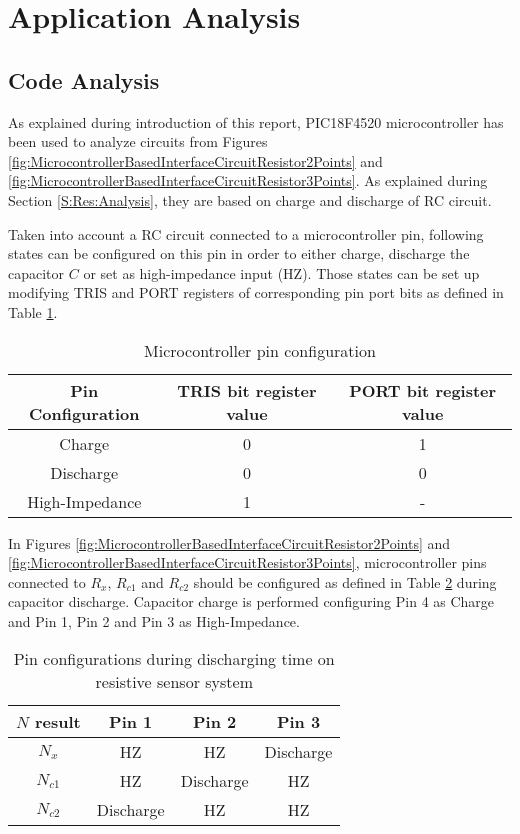 \section{Application Analysis}\label{S:Res:Code}


\subsection{Code Analysis}\label{SS:Res:Code:Analysis}
As explained during introduction of this report, PIC18F4520 microcontroller has been used to analyze circuits from Figures \ref{fig:MicrocontrollerBasedInterfaceCircuitResistor2Points} and \ref{fig:MicrocontrollerBasedInterfaceCircuitResistor3Points}. As explained during Section \ref{S:Res:Analysis}, they are based on charge and discharge of RC circuit.
\medskip

Taken into account a RC circuit connected to a microcontroller pin, following states can be configured on this pin in order to either charge, discharge the capacitor $C$ or set as high-impedance input (HZ). Those states can be set up modifying TRIS and PORT registers of corresponding pin port bits as defined in Table \ref{tab:PinConfigurations}.
\medskip

\begin{table}[h]
\centering
\begin{tabular}{|c|c|c|}
\hline
Pin Configuration & TRIS bit register value & PORT bit register value \\
\hline
Charge & 0 & 1 \\
\hline
Discharge & 0 & 0 \\
\hline
High-Impedance & 1 & - \\
\hline
\end{tabular}
\caption{Microcontroller pin configuration}
\label{tab:PinConfigurations}
\end{table}
\medskip

In Figures \ref{fig:MicrocontrollerBasedInterfaceCircuitResistor2Points} and \ref{fig:MicrocontrollerBasedInterfaceCircuitResistor3Points}, microcontroller pins connected to $R_{x}$, $R_{c1}$ and $R_{c2}$ should be configured as defined in Table \ref{tab:DischargePinConfigurationsRes} during capacitor discharge. Capacitor charge is performed configuring Pin 4 as Charge and Pin 1, Pin 2 and Pin 3 as High-Impedance.
\medskip

\begin{table}[h]
\centering
\begin{tabular}{|c|c|c|c|}
\hline
$N$ result & Pin 1 & Pin 2 & Pin 3 \\
\hline
$N_{x}$ & HZ & HZ & Discharge \\
\hline
$N_{c1}$ & HZ & Discharge & HZ \\
\hline
$N_{c2}$ & Discharge & HZ & HZ \\
\hline
\end{tabular}
\caption{Pin configurations during discharging time on resistive sensor system}
\label{tab:DischargePinConfigurationsRes}
\end{table}
\medskip

